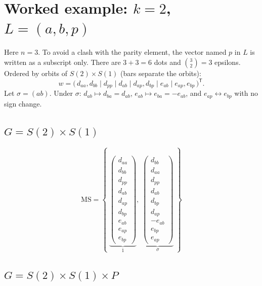 \documentclass[11pt]{article}
\theoremstyle{definition}
\theoremstyle{remark}
\newcommand{\MS}{\mathrm{MS}}
\begin{document}
\section{Worked example: $k = 2$, $L = (a, b, p)$}

Here $n = 3$. To avoid a clash with the parity element, the vector named $p$ in
$L$ is written as a subscript only. There are $3 + 3 = 6$ dots and
$\binom{3}{2} = 3$ epsilons. Ordered by orbits of $S(2) \times S(1)$ (bars
separate the orbits):
\[
  w = \bigl(\, d_{aa}, d_{bb} \;\big|\; d_{pp} \;\big|\; d_{ab} \;\big|\;
      d_{ap}, d_{bp} \;\big|\; e_{ab} \;\big|\; e_{ap}, e_{bp} \,\bigr)^{\mathsf T}.
\]
Let $\sigma = (ab)$. Under $\sigma$: $d_{ab} \mapsto d_{ba} = d_{ab}$,
$e_{ab} \mapsto e_{ba} = -e_{ab}$, and $e_{ap} \leftrightarrow e_{bp}$ with no
sign change.

\subsection{$G = S(2) \times S(1)$}

\[
  \MS = \left\{\;
  \underbrace{\begin{pmatrix}
    d_{aa}\\ d_{bb}\\ d_{pp}\\ d_{ab}\\ d_{ap}\\ d_{bp}\\ e_{ab}\\ e_{ap}\\ e_{bp}
  \end{pmatrix}}_{1},\;
  \underbrace{\begin{pmatrix}
    d_{bb}\\ d_{aa}\\ d_{pp}\\ d_{ab}\\ d_{bp}\\ d_{ap}\\ -e_{ab}\\ e_{bp}\\ e_{ap}
  \end{pmatrix}}_{\sigma}
  \;\right\}
\]

\subsection{$G = S(2) \times S(1) \times P$}
\end{document}
